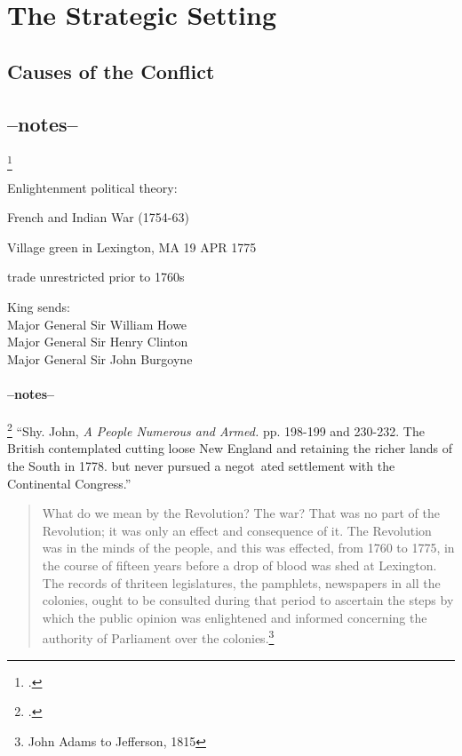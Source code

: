 \section{The Strategic Setting}

\subsection{Causes of the Conflict}



\subsection{--notes--}\footcite[2]{moncure_cowpens_1996}

Enlightenment political theory:

French and Indian War (1754-63)

Village green in Lexington, MA 19 APR 1775

trade unrestricted prior to 1760s

King sends:\\
Major General Sir William Howe\\
Major General Sir Henry Clinton\\
Major General Sir John Burgoyne

\paragraph{--notes--}\footcite[]{}
``Shy. John, \emph{A People Numerous and Armed.} pp. 198-199 and 230-232. The British contemplated cutting loose New England and retaining the richer lands of the South in 1778. but never pursued a negot~ated settlement with the Continental Congress.''


\begin{quotation}
  What do we mean by the Revolution? The war? That was no part of the Revolution;
  it was only an effect and consequence of it. The Revolution was in the minds of
  the people, and this was effected, from 1760 to 1775, in the course of
  fifteen years before a drop of blood was shed at Lexington. The records of
  thriteen legislatures, the pamphlets, newspapers in all the colonies, ought
  to be consulted during that period to ascertain the steps by which the public
  opinion was enlightened and informed concerning the authority of Parliament
  over the colonies.\footnote{John Adams to Jefferson, 1815}
\end{quotation}


